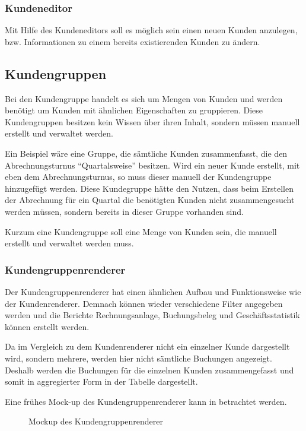 \subsubsection{Kundeneditor}
Mit Hilfe des Kundeneditors soll es möglich sein einen neuen Kunden anzulegen, bzw. Informationen zu einem bereits existierenden Kunden zu ändern.

\subsection{Kundengruppen}
Bei den Kundengruppe handelt es sich um Mengen von Kunden und werden benötigt um Kunden mit ähnlichen Eigenschaften zu gruppieren.
Diese Kundengruppen besitzen kein Wissen über ihren Inhalt, sondern müssen manuell erstellt und verwaltet werden.

Ein Beispiel wäre eine Gruppe, die sämtliche Kunden zusammenfasst, die den Abrechnungsturnus "`Quartalsweise"' besitzen. Wird ein neuer Kunde erstellt, mit eben dem Abrechnungsturnus, so muss dieser manuell der Kundengruppe hinzugefügt werden.
Diese Kundegruppe hätte den Nutzen, dass beim Erstellen der Abrechnung für ein Quartal die benötigten Kunden nicht zusammengesucht werden müssen, sondern bereits in dieser Gruppe vorhanden sind.

Kurzum eine Kundengruppe soll eine Menge von Kunden sein, die manuell erstellt und verwaltet werden muss.
 
\subsubsection{Kundengruppenrenderer}
Der Kundengruppenrenderer hat einen ähnlichen Aufbau und Funktionsweise wie der Kundenrenderer.
Demnach können wieder verschiedene Filter angegeben werden  und die Berichte Rechnungsanlage, Buchungsbeleg und Geschäftsstatistik können erstellt werden.

Da im Vergleich zu dem Kundenrenderer nicht ein einzelner Kunde dargestellt wird, sondern mehrere, werden hier nicht sämtliche Buchungen angezeigt. Deshalb werden die Buchungen für die einzelnen Kunden zusammengefasst und somit in aggregierter Form in der Tabelle dargestellt.

Eine frühes Mock-up des Kundengruppenrenderer kann in  betrachtet werden.
\begin{figure}[htbp]
	\centering
	\caption{Mockup des Kundengruppenrenderer}
	\label{fig:mockup-kunderenderer}
\end{figure}

